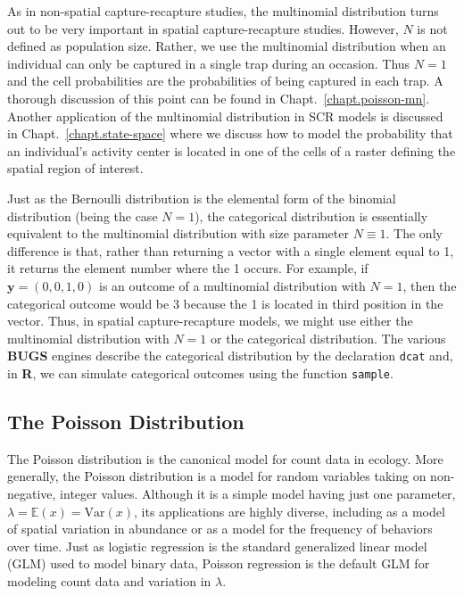As in non-spatial capture-recapture studies, the multinomial
distribution turns out to be very important in spatial
capture-recapture studies. However, $N$ is not defined as population
size. Rather, we use the multinomial distribution when an individual
can only be captured in a single trap during an occasion. Thus
$N=1$ and the cell probabilities are the probabilities of
being captured in each trap. A thorough discussion of this point can
be found in Chapt.~\ref{chapt.poisson-mn}. Another application of the
multinomial distribution in SCR models is discussed in
Chapt.~\ref{chapt.state-space} where we discuss how to model the
probability that an individual's activity center is located in one of
the cells of a raster defining the spatial region of interest.

Just as the Bernoulli distribution is the elemental form of the
 binomial distribution (being the case $N=1$), the
categorical distribution is essentially equivalent to
the multinomial distribution with size parameter
$N\equiv1$. The only difference is that, rather than returning a
vector with a single element equal to 1, it returns the element number
where the 1 occurs. For example, if $\mathbf{y}=(0,0,1,0)$ is an outcome of a
multinomial distribution with $N=1$, then the categorical outcome
would be 3 because the 1 is located in third position in the vector. Thus, in spatial
capture-recapture models, we might use either the multinomial
distribution with $N=1$ or %
the categorical distribution. %
The various {\bf BUGS} engines describe the categorical distribution
by the declaration \mbox{\tt dcat} and, in {\bf R}, we can simulate
categorical outcomes using the function \mbox{\tt sample}.


\subsection{The Poisson Distribution}


The Poisson distribution is the canonical model for count data in
ecology.  More generally, the
Poisson distribution is a model for random variables taking on
non-negative, integer values.  Although it is a simple model having just one
parameter, $\lambda = \mathbb{E}(x) = \text{Var}(x)$, its applications
are highly diverse, including
as a model of spatial variation in abundance or as a model for the
frequency of behaviors over time.  Just as logistic regression is the
standard generalized linear model (GLM) used to model binary data, Poisson
regression is the default GLM for modeling count data and variation in
$\lambda$.

